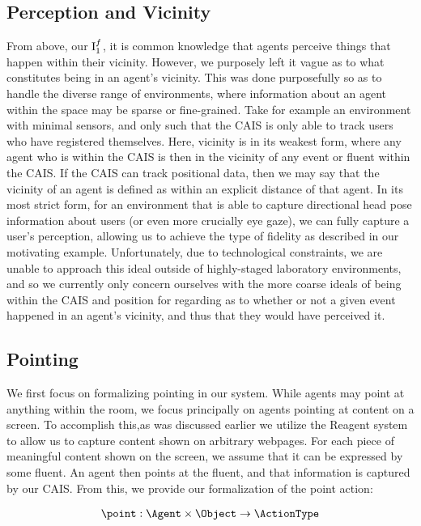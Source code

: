 \subsection{Perception and Vicinity}

From above, our $\textnormal{I}_{1}^{f}$, it is common knowledge that agents perceive
things that happen within their vicinity. However, we purposely left it vague as to
what constitutes being in an agent's vicinity. This was done purposefully so as to
handle the diverse range of environments, where information about an agent within
the space may be sparse or fine-grained. Take for example an environment with minimal
sensors, and only such that the CAIS is only able to track users who have registered
themselves. Here, vicinity is in its weakest form, where any agent who is within the CAIS
is then in the vicinity of any event or fluent within the CAIS. If the CAIS can track
positional data, then we may say that the vicinity of an agent is defined as within an
explicit distance of that agent. In its most strict form, for an environment that is
able to capture directional head pose information about users (or even more crucially
eye gaze), we can fully capture a user's perception, allowing us to achieve the
type of fidelity as described in our motivating example. Unfortunately, due to
technological constraints, we are unable to approach this ideal outside of highly-staged
laboratory environments, and so we currently only concern ourselves with the more
coarse ideals of being within the CAIS and position for regarding as to whether or not
a given event happened in an agent's vicinity, and thus that they would have perceived it.

\subsection{Pointing}

We first focus on formalizing pointing in our system. While agents may point at anything 
within the room, we focus principally on agents pointing at content on a screen. To 
accomplish this,as was discussed earlier we utilize the Reagent system to allow us to
capture content  shown on arbitrary webpages. For each piece of meaningful content shown on 
the screen, we  assume that it can be expressed by some fluent. An agent then points at the 
fluent, and that information is captured by our CAIS. From this, we provide our
formalization of the point action:

\begin{equation*}
\begin{aligned}
  \point: \Agent \times \Object \rightarrow \ActionType
\end{aligned}
\end{equation*}

